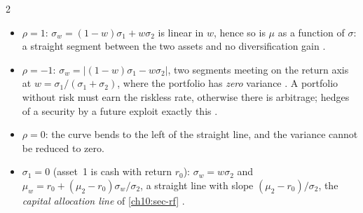 \begin{paracol}{2}
\begin{itemize}
  \item $\rho=1$: $\sigma_w=(1-w)\sigma_1+w\sigma_2$ is linear in $w$, hence so is $\mu$ as a function of $\sigma$:
        a straight segment between the two assets and no diversification gain
        .
  \item $\rho=-1$: $\sigma_w=|(1-w)\sigma_1-w\sigma_2|$, two segments meeting on the return axis at
        $w=\sigma_1/(\sigma_1+\sigma_2)$, where the portfolio has \emph{zero} variance
        . A portfolio without risk must earn the riskless rate, otherwise
        there is arbitrage; hedges of a security by a future exploit exactly this .
  \item $\rho=0$: the curve bends to the left of the straight line, and the variance cannot be reduced to zero.
  \item $\sigma_1=0$ (asset~1 is cash with return $r_0$): $\sigma_w=w\sigma_2$ and
        $\mu_w=r_0+(\mu_2-r_0)\sigma_w/\sigma_2$, a straight line with slope $(\mu_2-r_0)/\sigma_2$, the
        \emph{capital allocation line} of \cref{ch10:sec-rf} .
\end{itemize}


\end{paracol}
